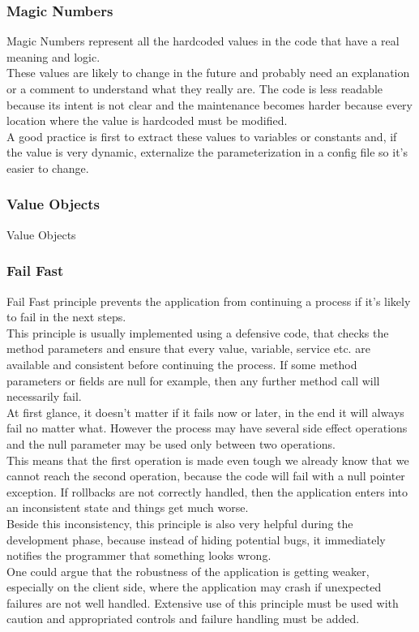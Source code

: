 \subsubsection{Magic Numbers}
Magic Numbers represent all the hardcoded values in the code that have
a real meaning and logic. \\
\newline
These values are likely to change in the future and probably need an
explanation or a comment to understand what they really are.
The code is less readable because its intent is not clear and the
maintenance becomes harder because every location where the value
is hardcoded must be modified. \\
A good practice is first to extract these values to variables or
constants and, if the value is very dynamic, externalize the
parameterization in a config file so it's easier to change.

\subsubsection{Value Objects}
Value Objects

\subsubsection{Fail Fast}
Fail Fast principle prevents the application from continuing a process if
it's likely to fail in the next steps. \\
\newline
This principle is usually implemented using a defensive code, that checks
the method parameters and ensure that every value, variable, service etc.
are available and consistent before continuing the process.
If some method parameters or fields are null for example, then any
further method call will necessarily fail. \\
\newline
At first glance, it doesn't matter if it fails now or later, in the end
it will always fail no matter what.
However the process may have several side effect operations and the null
parameter may be used only between two operations. \\
This means that the first operation is made even tough we already know
that we cannot reach the second operation, because the code will fail
with a null pointer exception.
If rollbacks are not correctly handled, then the application enters into
an inconsistent state and things get much worse. \\
\newline
Beside this inconsistency, this principle is also very helpful during
the development phase, because instead of hiding potential bugs, it
immediately notifies the programmer that something looks wrong. \\
One could argue that the robustness of the application is getting
weaker, especially on the client side, where the application may crash
if unexpected failures are not well handled.
Extensive use of this principle must be used with caution and
appropriated controls and failure handling must be added.

